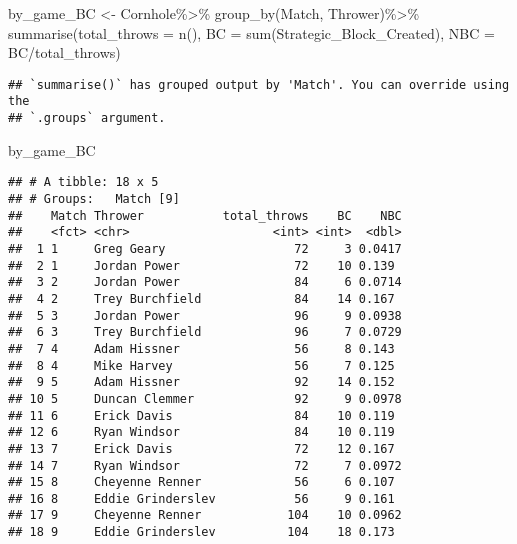 \documentclass[
]{article}
\newenvironment{Shaded}{\begin{snugshade}}{\end{snugshade}}
\newcommand{\AttributeTok}[1]{\textcolor[rgb]{0.77,0.63,0.00}{#1}}
\newcommand{\FunctionTok}[1]{\textcolor[rgb]{0.00,0.00,0.00}{#1}}
\newcommand{\NormalTok}[1]{#1}
\newcommand{\OtherTok}[1]{\textcolor[rgb]{0.56,0.35,0.01}{#1}}
\newcommand{\SpecialCharTok}[1]{\textcolor[rgb]{0.00,0.00,0.00}{#1}}
\begin{document}
\begin{Shaded}
\begin{Highlighting}[]
\NormalTok{by\_game\_BC }\OtherTok{\textless{}{-}}\NormalTok{ Cornhole}\SpecialCharTok{\%\textgreater{}\%}
  \FunctionTok{group\_by}\NormalTok{(Match, Thrower)}\SpecialCharTok{\%\textgreater{}\%}
  \FunctionTok{summarise}\NormalTok{(}\AttributeTok{total\_throws =} \FunctionTok{n}\NormalTok{(),}
            \AttributeTok{BC =} \FunctionTok{sum}\NormalTok{(Strategic\_Block\_Created),}
            \AttributeTok{NBC =}\NormalTok{ BC}\SpecialCharTok{/}\NormalTok{total\_throws)}
\end{Highlighting}
\end{Shaded}

\begin{verbatim}
## `summarise()` has grouped output by 'Match'. You can override using the
## `.groups` argument.
\end{verbatim}

\begin{Shaded}
\begin{Highlighting}[]
\NormalTok{by\_game\_BC}
\end{Highlighting}
\end{Shaded}

\begin{verbatim}
## # A tibble: 18 x 5
## # Groups:   Match [9]
##    Match Thrower           total_throws    BC    NBC
##    <fct> <chr>                    <int> <int>  <dbl>
##  1 1     Greg Geary                  72     3 0.0417
##  2 1     Jordan Power                72    10 0.139 
##  3 2     Jordan Power                84     6 0.0714
##  4 2     Trey Burchfield             84    14 0.167 
##  5 3     Jordan Power                96     9 0.0938
##  6 3     Trey Burchfield             96     7 0.0729
##  7 4     Adam Hissner                56     8 0.143 
##  8 4     Mike Harvey                 56     7 0.125 
##  9 5     Adam Hissner                92    14 0.152 
## 10 5     Duncan Clemmer              92     9 0.0978
## 11 6     Erick Davis                 84    10 0.119 
## 12 6     Ryan Windsor                84    10 0.119 
## 13 7     Erick Davis                 72    12 0.167 
## 14 7     Ryan Windsor                72     7 0.0972
## 15 8     Cheyenne Renner             56     6 0.107 
## 16 8     Eddie Grinderslev           56     9 0.161 
## 17 9     Cheyenne Renner            104    10 0.0962
## 18 9     Eddie Grinderslev          104    18 0.173
\end{verbatim}
\end{document}
